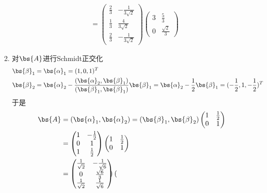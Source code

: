 \documentclass[12pt, a4paper, oneside, UTF8]{ctexbook}
\begin{document}
\begin{solution}
\begin{enumerate}[label=(\arabic*)]
\begin{align*}
            &=\begin{pmatrix}
                \frac{2}{3}& -\frac{1}{3\sqrt{2}}\\
                \frac{1}{3}& \frac{4}{3\sqrt{2}}\\
                \frac{2}{3}&-\frac{1}{3\sqrt{2}}
            \end{pmatrix}
            \begin{pmatrix}
                3 &\frac{5}{3}\\
                0 & \frac{\sqrt{2}}{3}
            \end{pmatrix}
        \end{align*}
        \item 对$\bs{A}$进行Schmidt正交化
        \begin{align*}
            \bs{\beta}_1&=\bs{\alpha}_1=(1,0,1)^T \\
            \bs{\beta}_2&=\bs{\alpha}_2-\frac{(\bs{\alpha}_2,\bs{\beta}_1)}{(\bs{\beta}_1,\bs{\beta}_1)} \bs{\beta}_1
            =\bs{\alpha}_2-\frac{1}{2}\bs{\beta}_1=
            (-\frac{1}{2},1,-\frac{1}{2})^T
        \end{align*}
        于是
        \begin{align*}
            \bs{A}&=(\bs{\alpha}_1,\bs{\alpha}_2)
            =(\bs{\beta}_1,\bs{\beta}_2)\begin{pmatrix}
                1 &\frac{1}{2}\\
                0 & 1
            \end{pmatrix}\\
            &=\begin{pmatrix}
                1& -\frac{1}{2}\\
                0& 1\\
                1&\frac{1}{2}
            \end{pmatrix}
            \begin{pmatrix}
                1 &\frac{1}{2}\\
                0 & 1
            \end{pmatrix}\\
            &=\begin{pmatrix}
                \frac{1}{\sqrt{2}}& -\frac{1}{\sqrt{6}}\\
                0& \frac{\sqrt{6}}{3}\\
                \frac{1}{\sqrt{2}}&\frac{1}{\sqrt{6}}
            \end{pmatrix}
            \begin{pmatrix}

\end{pmatrix}
\end{align*}
\end{enumerate}
\end{solution}
\end{document}

